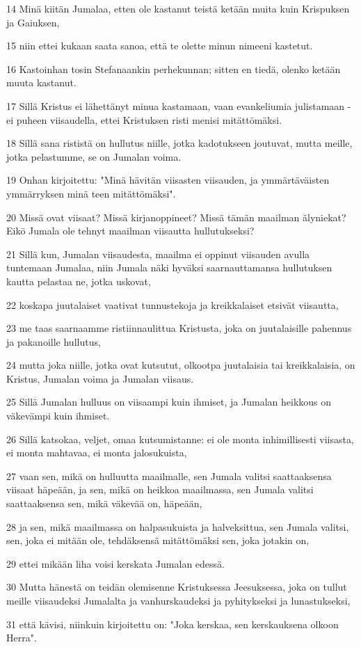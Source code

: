 \par 14 Minä kiitän Jumalaa, etten ole kastanut teistä ketään muita kuin Krispuksen ja Gaiuksen,
\par 15 niin ettei kukaan saata sanoa, että te olette minun nimeeni kastetut.
\par 16 Kastoinhan tosin Stefanaankin perhekunnan; sitten en tiedä, olenko ketään muuta kastanut.
\par 17 Sillä Kristus ei lähettänyt minua kastamaan, vaan evankeliumia julistamaan - ei puheen viisaudella, ettei Kristuksen risti menisi mitättömäksi.
\par 18 Sillä sana rististä on hullutus niille, jotka kadotukseen joutuvat, mutta meille, jotka pelastumme, se on Jumalan voima.
\par 19 Onhan kirjoitettu: "Minä hävitän viisasten viisauden, ja ymmärtäväisten ymmärryksen minä teen mitättömäksi".
\par 20 Missä ovat viisaat? Missä kirjanoppineet? Missä tämän maailman älyniekat? Eikö Jumala ole tehnyt maailman viisautta hullutukseksi?
\par 21 Sillä kun, Jumalan viisaudesta, maailma ei oppinut viisauden avulla tuntemaan Jumalaa, niin Jumala näki hyväksi saarnauttamansa hullutuksen kautta pelastaa ne, jotka uskovat,
\par 22 koskapa juutalaiset vaativat tunnustekoja ja kreikkalaiset etsivät viisautta,
\par 23 me taas saarnaamme ristiinnaulittua Kristusta, joka on juutalaisille pahennus ja pakanoille hullutus,
\par 24 mutta joka niille, jotka ovat kutsutut, olkootpa juutalaisia tai kreikkalaisia, on Kristus, Jumalan voima ja Jumalan viisaus.
\par 25 Sillä Jumalan hulluus on viisaampi kuin ihmiset, ja Jumalan heikkous on väkevämpi kuin ihmiset.
\par 26 Sillä katsokaa, veljet, omaa kutsumistanne: ei ole monta inhimillisesti viisasta, ei monta mahtavaa, ei monta jalosukuista,
\par 27 vaan sen, mikä on hulluutta maailmalle, sen Jumala valitsi saattaaksensa viisaat häpeään, ja sen, mikä on heikkoa maailmassa, sen Jumala valitsi saattaaksensa sen, mikä väkevää on, häpeään,
\par 28 ja sen, mikä maailmassa on halpasukuista ja halveksittua, sen Jumala valitsi, sen, joka ei mitään ole, tehdäksensä mitättömäksi sen, joka jotakin on,
\par 29 ettei mikään liha voisi kerskata Jumalan edessä.
\par 30 Mutta hänestä on teidän olemisenne Kristuksessa Jeesuksessa, joka on tullut meille viisaudeksi Jumalalta ja vanhurskaudeksi ja pyhitykseksi ja lunastukseksi,
\par 31 että kävisi, niinkuin kirjoitettu on: "Joka kerskaa, sen kerskauksena olkoon Herra".

